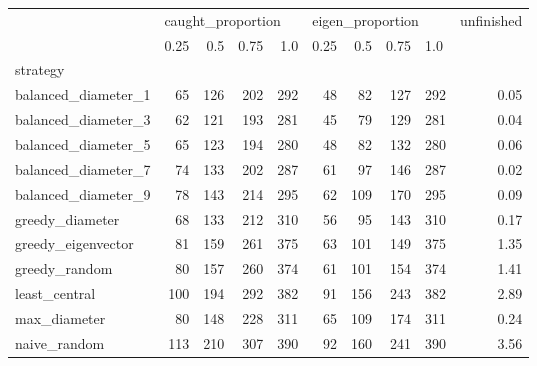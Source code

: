 \begin{tabular}{lrrrrrrrrr}
\toprule
{} & \multicolumn{4}{l}{caught\_proportion} & \multicolumn{4}{l}{eigen\_proportion} & unfinished \\
{} &              0.25 &  0.5 & 0.75 &  1.0 &             0.25 &  0.5 & 0.75 & \multicolumn{2}{l}{1.0} \\
strategy            &                   &      &      &      &                  &      &      &      &            \\
\midrule
balanced\_diameter\_1 &                65 &  126 &  202 &  292 &               48 &   82 &  127 &  292 &       0.05 \\
balanced\_diameter\_3 &                62 &  121 &  193 &  281 &               45 &   79 &  129 &  281 &       0.04 \\
balanced\_diameter\_5 &                65 &  123 &  194 &  280 &               48 &   82 &  132 &  280 &       0.06 \\
balanced\_diameter\_7 &                74 &  133 &  202 &  287 &               61 &   97 &  146 &  287 &       0.02 \\
balanced\_diameter\_9 &                78 &  143 &  214 &  295 &               62 &  109 &  170 &  295 &       0.09 \\
greedy\_diameter     &                68 &  133 &  212 &  310 &               56 &   95 &  143 &  310 &       0.17 \\
greedy\_eigenvector  &                81 &  159 &  261 &  375 &               63 &  101 &  149 &  375 &       1.35 \\
greedy\_random       &                80 &  157 &  260 &  374 &               61 &  101 &  154 &  374 &       1.41 \\
least\_central       &               100 &  194 &  292 &  382 &               91 &  156 &  243 &  382 &       2.89 \\
max\_diameter        &                80 &  148 &  228 &  311 &               65 &  109 &  174 &  311 &       0.24 \\
naive\_random        &               113 &  210 &  307 &  390 &               92 &  160 &  241 &  390 &       3.56 \\
\bottomrule
\end{tabular}
